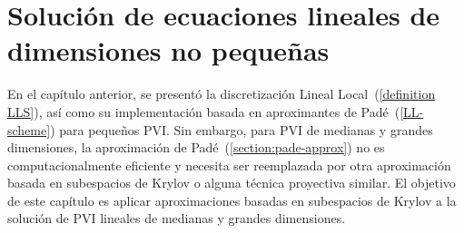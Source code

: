 \chapter{Solución de ecuaciones lineales de dimensiones no pequeñas}\label{chapter:solve-non-smal-lineal-eq}

En el capítulo anterior, se presentó la discretización Lineal Local~(\ref{definition LLS}), así como su implementación basada en aproximantes de Padé~(\ref{LL-scheme}) para pequeños PVI. Sin embargo, para PVI de medianas y grandes dimensiones, la aproximación de Padé~(\ref{section:pade-approx}) no es computacionalmente eficiente y necesita ser reemplazada por otra aproximación basada en subespacios de Krylov o alguna técnica proyectiva similar. El objetivo de este capítulo es aplicar aproximaciones basadas en subespacios de Krylov a la solución de PVI lineales de medianas y grandes dimensiones.


